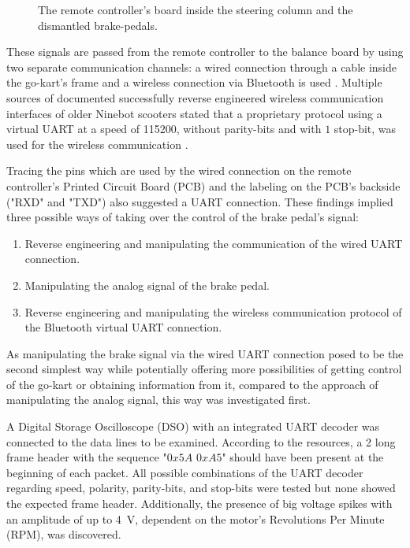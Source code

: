 \begin{figure}[!htbp]
\begin{subfigure}{0.24\textwidth}
\end{subfigure}
\caption{The remote controller's board inside the steering column and the dismantled brake-pedals.}
\label{fig:remote_controller_components}
\end{figure}
\FloatBarrier\noindent
These signals are passed from the remote controller to the balance board by using two separate communication channels: a wired connection through a cable inside the go-kart's frame and a wireless connection via Bluetooth is used \cite{ninebot_product_page}.
Multiple sources of documented successfully reverse engineered wireless communication interfaces of older Ninebot scooters stated that a proprietary protocol using a virtual UART at a speed of \SI{115200}{\baud}, without parity-bits and with $1$ stop-bit, was used for the wireless communication \cite{ninebot_protocol_github}\cite{ninebot_protocol_scooterhacking}.
\par
Tracing the pins which are used by the wired connection on the remote controller's Printed Circuit Board (PCB) and the labeling on the PCB's backside ("RXD" and "TXD") also suggested a UART connection.
These findings implied three possible ways of taking over the control of the brake pedal's signal:
\begin{enumerate}
    \item Reverse engineering and manipulating the communication of the wired UART connection.
    \item Manipulating the analog signal of the brake pedal.
    \item Reverse engineering and manipulating the wireless communication protocol of the Bluetooth virtual UART connection.
\end{enumerate}
As manipulating the brake signal via the wired UART connection posed to be the second simplest way while potentially offering more possibilities of getting control of the go-kart or obtaining information from it, compared to the approach of manipulating the analog signal, this way was investigated first.
\par
A Digital Storage Oscilloscope (DSO) with an integrated UART decoder was connected to the data lines to be examined.
According to the resources, a \SI{2}{\byte} long frame header with the sequence "$0x5A$ $0xA5$"
should have been present at the beginning of each packet\cite{ninebot_protocol_scooterhacking}.
All possible combinations of the UART decoder regarding speed, polarity, parity-bits, and stop-bits were tested but none showed the expected frame header.
Additionally, the presence of big voltage spikes with an amplitude of up to \SI{4}{\volt}, dependent on the motor's Revolutions Per Minute (RPM), was discovered.
